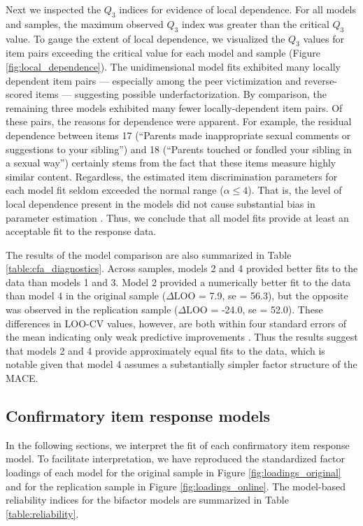 \documentclass[letterpaper,man,natbib,noextraspace,floatsintext,longtable,12pt]{apa6}
\begin{document}
Next we inspected the $Q_3$ indices for evidence of local dependence. For all models and samples, the maximum observed $Q_3$ index was greater than the critical $Q_3$ value. To gauge the extent of local dependence, we visualized the $Q_3$ values for item pairs exceeding the critical value for each model and sample (Figure \ref{fig:local_dependence}). The unidimensional model fits exhibited many locally dependent item pairs --- especially among the peer victimization and reverse-scored items --- suggesting possible underfactorization. By comparison, the remaining three models exhibited many fewer locally-dependent item pairs. Of these pairs, the reasons for dependence were apparent. For example, the residual dependence between items 17 (``Parents made inappropriate sexual comments or suggestions to your sibling'') and 18 (``Parents touched or fondled your sibling in a sexual way'') certainly stems from the fact that these items measure highly similar content. Regardless, the estimated item discrimination parameters for each model fit seldom exceeded the normal range ($\alpha \leq 4$). That is, the level of local dependence present in the models did not cause substantial bias in parameter estimation \citep{edwards2018diagnostic}. Thus, we conclude that all model fits provide at least an acceptable fit to the response data.

The results of the model comparison are also summarized in Table \ref{table:cfa_diagnostics}. Across samples, models 2 and 4 provided better fits to the data than models 1 and 3. Model 2 provided a numerically better fit to the data than model 4 in the original sample ($\Delta \text{LOO}$ = 7.9, se = 56.3), but the opposite was observed in the replication sample ($\Delta \text{LOO}$ = -24.0, se = 52.0). These differences in LOO-CV values, however, are both within four standard errors of the mean indicating only weak predictive improvements \citep{vehtari2022cv}. Thus the results suggest that models 2 and 4 provide approximately equal fits to the data, which is notable given that model 4 assumes a substantially simpler factor structure of the MACE.

\subsection{Confirmatory item response models}

In the following sections, we interpret the fit of each confirmatory item response model. To facilitate interpretation, we have reproduced the standardized factor loadings of each model for the original sample in Figure \ref{fig:loadings_original} and for the replication sample in Figure \ref{fig:loadings_online}. The model-based reliability indices for the bifactor models are summarized in Table \ref{table:reliability}. 
\end{document}
